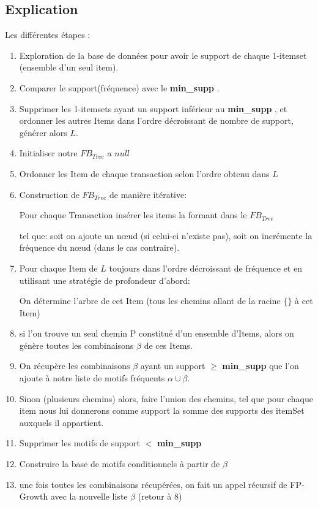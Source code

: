 \documentclass[12pt,a4paper,oneside]{book}
\begin{document}
	\subsection{Explication}
	Les différentes étapes :
	
	\begin{enumerate}
		\item Exploration de la base de données pour avoir le support de chaque 1-itemset (ensemble d'un seul item).
		\item Comparer le support(fréquence) avec le\textbf{ min\_supp} .
		\item  Supprimer les 1-itemsets ayant un support inférieur au \textbf{ min\_supp} , et ordonner les autres Items dans l'ordre décroissant de nombre de support, générer alors $L$.
		\item Initialiser notre $FB_{Tree}$ a $null$
		\item Ordonner les Item de chaque transaction selon l'ordre obtenu dans $L$
		\item Construction de $FB_{Tree}$ de manière itérative:
		
		Pour chaque Transaction insérer les items la formant dans le $FB_{Tree}$
		
		tel que: soit on ajoute un nœud (si celui-ci n'existe pas), soit on incrémente la fréquence du nœud (dans le cas contraire).
		
		\item Pour chaque Item de $L$ toujours dans l'ordre décroissant de fréquence et en utilisant une stratégie de profondeur d'abord:
		
		On détermine l'arbre de cet Item (tous les chemins allant de la racine $\{\}$ à cet Item)
		
		\item si l'on trouve un seul chemin P constitué d'un ensemble d'Items, alors on génère toutes les combinaisons  $\beta$ de ces Items.
		
		\item On récupère les combinaisons $\beta$ ayant un support $\geq$ \textbf{ min\_supp} que l'on ajoute à notre liste de motifs fréquents $\alpha \cup \beta$.
		
		\item Sinon (plusieurs chemins) alors, faire l'union des chemins, tel que pour chaque item nous lui donnerons comme support la somme des supports des itemSet auxquels il appartient.
		
		\item Supprimer les motifs de support $<$ \textbf{ min\_supp} 
		
		\item Construire la base de motifs conditionnels à partir de $\beta$  
		
		\item une fois toutes les combinaisons récupérées, on fait un appel récursif de FP-Growth avec la nouvelle liste $\beta$ (retour à 8)
	\end{enumerate}
	
\end{document}
